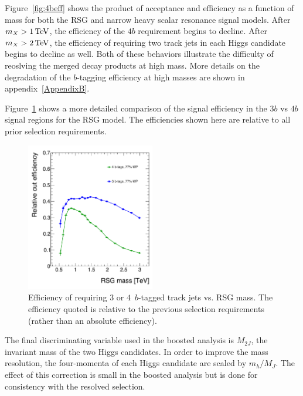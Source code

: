 Figure~\ref{fig:4beff} shows the product of acceptance and efficiency as a function of mass for both the RSG and narrow heavy scalar resonance signal models. After $m_{X} > 1 \TeV$, the efficiency of the $4b$ requirement begins to decline. After $m_{X} > 2 \TeV$, the efficiency of requiring two track jets in each Higgs candidate begins to decline as well. Both of these behaviors illustrate the difficulty of reoslving the merged decay products at high mass. More details on the degradation of the $b$-tagging efficiency at high masses are shown in appendix~\ref{AppendixB}. 

Figure~\ref{fig:3bvs4b} shows a more detailed comparison of the signal efficiency in the $3b$ vs $4b$ signal regions for the RSG model. The efficiencies shown here are relative to all prior selection requirements. 

\begin{figure}[h!]
  \centering
  \captionsetup{justification=centering}

  \includegraphics[width=0.5\textwidth]{figures/3bvs4b_eff}
  \caption{Efficiency of requiring $3$ or $4\,$ $b$-tagged track jets vs. RSG mass. The efficiency quoted is relative to the previous selection requirements (rather than an absolute efficiency). }
  \label{fig:3bvs4b}
\end{figure}

The final discriminating variable used in the boosted analysis is $M_{2J}$, the invariant mass of the two Higgs candidates. In order to improve the mass resolution, the four-momenta of each Higgs candidate are scaled by $m_{h}/M_{J}$. The effect of this correction is small in the boosted analysis but is done for consistency with the resolved selection. 


